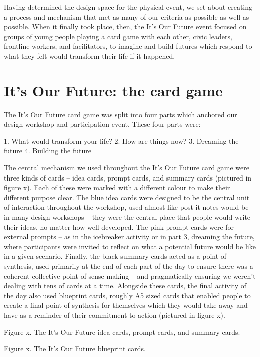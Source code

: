 Having determined the design space for the physical event, we set about creating a process and mechanism that met as many of our criteria as possible as well as possible. When it finally took place, then, the It’s Our Future event focused on groups of young people playing a card game with each other, civic leaders, frontline workers, and facilitators, to imagine and build futures which respond to what they felt would transform their life if it happened.  

\section{It’s Our Future: the card game}

The It’s Our Future card game was split into four parts which anchored our design workshop and participation event. These four parts were:

1.	What would transform your life?
2.	How are things now?
3.	Dreaming the future
4.	Building the future

The central mechanism we used throughout the It’s Our Future card game were three kinds of cards – idea cards, prompt cards, and summary cards (pictured in figure x). Each of these were marked with a different colour to make their different purpose clear. The blue idea cards were designed to be the central unit of interaction throughout the workshop, used almost like post-it notes would be in many design workshops – they were the central place that people would write their ideas, no matter how well developed. The pink prompt cards were for external prompts – as in the icebreaker activity or in part 3, dreaming the future, where participants were invited to reflect on what a potential future would be like in a given scenario. Finally, the black summary cards acted as a point of synthesis, used primarily at the end of each part of the day to ensure there was a coherent collective point of sense-making – and pragmatically ensuring we weren’t dealing with tens of cards at a time. Alongside these cards, the final activity of the day also used blueprint cards, roughly A5 sized cards that enabled people to create a final point of synthesis for themselves which they would take away and have as a reminder of their commitment to action (pictured in figure x). 

Figure x. The It’s Our Future idea cards, prompt cards, and summary cards.

Figure x. The It’s Our Future blueprint cards. 

